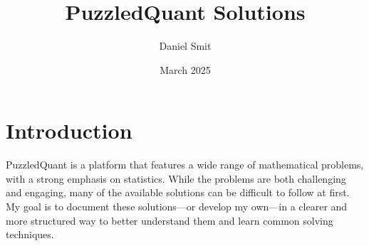 \documentclass{article}
\title{PuzzledQuant Solutions}
\author{Daniel Smit}
\date{March 2025}
\begin{document}
\maketitle

\section{Introduction}
PuzzledQuant is a platform that features a wide range of mathematical problems, with a strong emphasis on statistics. While the problems are both challenging and engaging, many of the available solutions can be difficult to follow at first. My goal is to document these solutions—or develop my own—in a clearer and more structured way to better understand them and learn common solving techniques.
\end{document}

